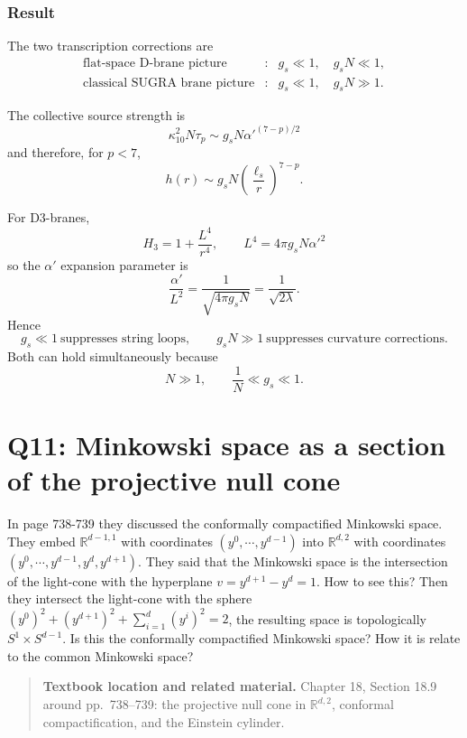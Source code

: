 \documentclass[
  10pt,
  a4paper,
  openany]{book}
\begin{document}
\subsubsection{Result}\label{result-45}

The two transcription corrections are \[
\boxed{
\begin{array}{ccl}
\text{flat-space D-brane picture}
&:&
g_s\ll1,\quad g_sN\ll1,\\[2mm]
\text{classical SUGRA brane picture}
&:&
g_s\ll1,\quad g_sN\gg1.
\end{array}
}
\]

The collective source strength is \[
\boxed{
\kappa_{10}^2N\tau_p
\sim
g_sN\alpha'^{(7-p)/2}
}
\] and therefore, for \(p<7\), \[
h(r)
\sim
g_sN
\left(\frac{\ell_s}{r}\right)^{7-p}.
\]

For D3-branes, \[
\boxed{
H_3=1+\frac{L^4}{r^4},
\qquad
L^4=4\pi g_sN\alpha'^2
}
\] so the \(\alpha'\) expansion parameter is \[
\boxed{
\frac{\alpha'}{L^2}
=\frac1{\sqrt{4\pi g_sN}}
=\frac1{\sqrt{2\lambda}}
}.
\] Hence \[
\boxed{
g_s\ll1
\ \text{suppresses string loops},
\qquad
g_sN\gg1
\ \text{suppresses curvature corrections}
}.
\] Both can hold simultaneously because \[
\boxed{
N\gg1,
\qquad
\frac1N\ll g_s\ll1
}.
\]

\section{Q11: Minkowski space as a section of the projective null
cone}\label{q11-minkowski-space-as-a-section-of-the-projective-null-cone}

In page 738-739 they discussed the conformally compactified Minkowski
space. They embed \(\mathbb{R}^{d-1,1}\) with coordinates
\((y^0,\cdots,y^{d-1})\) into \(\mathbb{R}^{d,2}\) with coordinates
\((y^0,\cdots,y^{d-1},y^d,y^{d+1})\). They said that the Minkowski space
is the intersection of the light-cone with the hyperplane
\(v=y^{d+1}-y^d=1\). How to see this? Then they intersect the light-cone
with the sphere \((y^0)^2+(y^{d+1})^2+\sum_{i=1}^d(y^i)^2=2\), the
resulting space is topologically \(S^1\times S^{d-1}\). Is this the
conformally compactified Minkowski space? How it is relate to the common
Minkowski space?

\begin{quote}
\textbf{Textbook location and related material.} Chapter 18, Section
18.9 around pp.~738--739: the projective null cone in
\(\mathbb R^{d,2}\), conformal compactification, and the Einstein
cylinder.
\end{quote}
\end{document}
